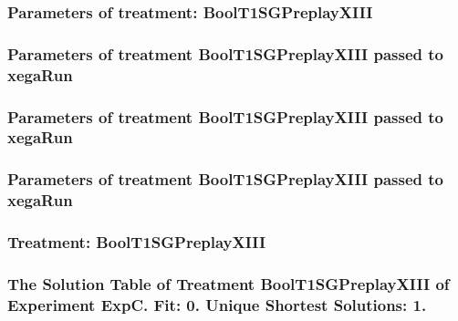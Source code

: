 \documentclass[18pt,c]{beamer}
\begin{document}
 \begin{frame}
 \fontsize{8pt}{9pt}\selectfont
 \frametitle{  Parameters of treatment: BoolT1SGPreplayXIII 
 }

 \label{ExpCtParmTable000.tex}  
 \end{frame}


 \begin{frame}
 \fontsize{8pt}{9pt}\selectfont
 \frametitle{  Parameters of treatment BoolT1SGPreplayXIII passed to xegaRun
 }

 \label{ExpCtParmTable001.tex}  
 \end{frame}


 \begin{frame}
 \fontsize{8pt}{9pt}\selectfont
 \frametitle{  Parameters of treatment BoolT1SGPreplayXIII passed to xegaRun
 }

 \label{ExpCtParmTable002.tex}  
 \end{frame}


 \begin{frame}
 \fontsize{8pt}{9pt}\selectfont
 \frametitle{  Parameters of treatment BoolT1SGPreplayXIII passed to xegaRun
 }

 \label{ExpCtParmTable003.tex}  
 \end{frame}

 \begin{frame}
 \fontsize{8pt}{9pt}\selectfont
 \frametitle{ Treatment: BoolT1SGPreplayXIII }

 \label{ExpCStatsTable007.tex}  
 \end{frame}

 \begin{frame}
 \fontsize{8pt}{9pt}\selectfont
 \frametitle{ The Solution Table of Treatment BoolT1SGPreplayXIII of Experiment ExpC. Fit: 0. Unique Shortest Solutions: 1. }

 \label{ExpCSolutionTable000.tex}  
 \end{frame}
\end{document}
